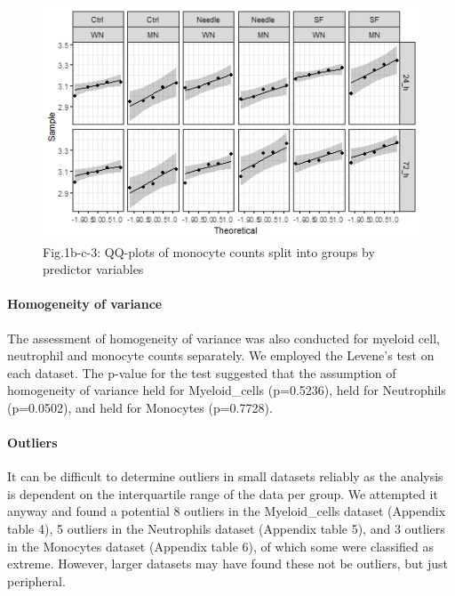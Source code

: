 \documentclass[
  12pt,
  letterpaper,
]{article}
\begin{document}
\begin{figure}[H]

{\centering \includegraphics[width=0.95\linewidth,]{Statistics_Report_files/figure-latex/qq-plot-figure-1b-c-monocytes-1} 

}

\caption{Fig.1b-c-3: QQ-plots of monocyte counts split into groups by predictor variables}\label{fig:qq-plot-figure-1b-c-monocytes}
\end{figure}

\paragraph{Homogeneity of variance}\label{homogeneity-of-variance}

The assessment of homogeneity of variance was also conducted for myeloid cell, neutrophil and monocyte counts separately. We employed the Levene's test on each dataset. The p-value for the test suggested that the assumption of homogeneity of variance held for Myeloid\_cells (p=0.5236), held for Neutrophils (p=0.0502), and held for Monocytes (p=0.7728).

\paragraph{Outliers}\label{outliers}

It can be difficult to determine outliers in small datasets reliably as the analysis is dependent on the interquartile range of the data per group. We attempted it anyway and found a potential 8 outliers in the Myeloid\_cells dataset (Appendix table 4), 5 outliers in the Neutrophils dataset (Appendix table 5), and 3 outliers in the Monocytes dataset (Appendix table 6), of which some were classified as extreme. However, larger datasets may have found these not be outliers, but just peripheral.
\end{document}
